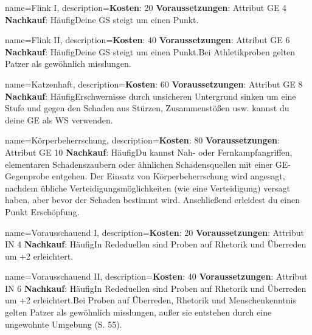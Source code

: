 {
    name={Flink I},
    description={\textbf{Kosten}: 20 \textbf{Voraussetzungen}: Attribut GE 4 \textbf{Nachkauf}: Häufig\newline Deine GS steigt um einen Punkt.}
}


{
    name={Flink II},
    description={\textbf{Kosten}: 40 \textbf{Voraussetzungen}: Attribut GE 6 \textbf{Nachkauf}: Häufig\newline Deine GS steigt um einen Punkt.\newline Bei Athletikproben gelten Patzer als gewöhnlich misslungen.}
}


{
    name={Katzenhaft},
    description={\textbf{Kosten}: 60 \textbf{Voraussetzungen}: Attribut GE 8 \textbf{Nachkauf}: Häufig\newline Erschwernisse durch unsicheren Untergrund sinken um eine Stufe und gegen den Schaden aus Stürzen, Zusammenstößen usw. kannst du deine GE als WS verwenden.}
}


{
    name={Körperbeherrschung},
    description={\textbf{Kosten}: 80 \textbf{Voraussetzungen}: Attribut GE 10 \textbf{Nachkauf}: Häufig\newline Du kannst Nah- oder Fernkampfangriffen, elementaren Schadenszaubern oder ähnlichen Schadensquellen mit einer GE-Gegenprobe entgehen. Der Einsatz von Körperbeherrschung wird angesagt, nachdem übliche Verteidigungsmöglichkeiten (wie eine Verteidigung) versagt haben, aber bevor der Schaden bestimmt wird. Anschließend erleidest du einen Punkt Erschöpfung.}
}


{
    name={Vorausschauend I},
    description={\textbf{Kosten}: 20 \textbf{Voraussetzungen}: Attribut IN 4 \textbf{Nachkauf}: Häufig\newline In Rededuellen sind Proben auf Rhetorik und Überreden um +2 erleichtert.}
}


{
    name={Vorausschauend II},
    description={\textbf{Kosten}: 40 \textbf{Voraussetzungen}: Attribut IN 6 \textbf{Nachkauf}: Häufig\newline In Rededuellen sind Proben auf Rhetorik und Überreden um +2 erleichtert.\newline Bei Proben auf Überreden, Rhetorik und Menschenkenntnis gelten Patzer als gewöhnlich misslungen, außer sie entstehen durch eine ungewohnte Umgebung (S. 55).}
}


